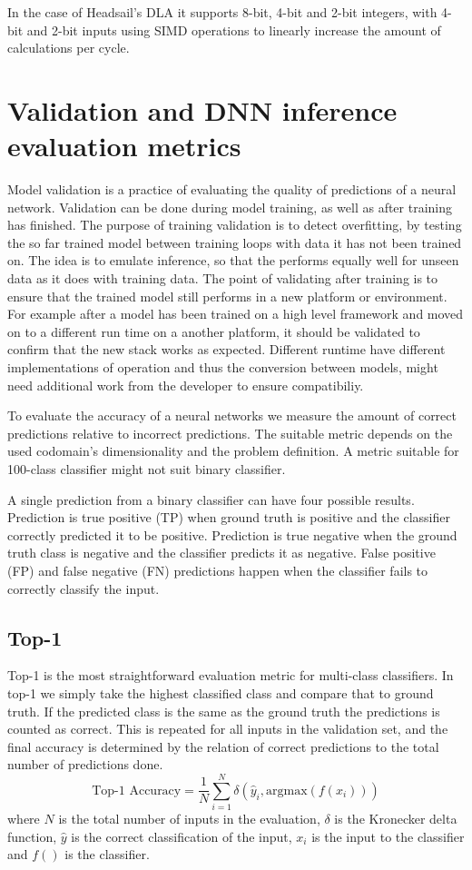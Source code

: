 \documentclass[12pt,a4paper,english
]{tunithesis}
\begin{document}
In the case of Headsail's DLA it supports 8-bit, 4-bit and 2-bit integers, with 4-bit and 2-bit inputs using SIMD operations to linearly increase the amount of calculations per cycle.

\section{Validation and DNN inference evaluation metrics}
Model validation is a practice of evaluating the quality of predictions of a neural network. Validation can be done during model training, as well as after training has finished. The purpose of training validation is to detect overfitting, by testing the so far trained model between training loops with data it has not been trained on. The idea is to emulate inference, so that the performs equally well for unseen data as it does with training data. The point of validating after training is to ensure that the trained model still performs in a new platform or environment. For example after a model has been trained on a high level framework and moved on to a different run time on a another platform, it should be validated to confirm that the new stack works as expected. Different runtime have different implementations of operation and thus the conversion between models, might need additional work from the developer to ensure compatibiliy.

To evaluate the accuracy of a neural networks we measure the amount of correct predictions relative to incorrect predictions. The suitable metric depends on the used codomain's dimensionality and the problem definition. A metric suitable for 100-class classifier might not suit binary classifier.

A single prediction from a binary classifier can have four possible results. Prediction is true positive (TP) when ground truth is positive and the classifier correctly predicted it to be positive. Prediction is true negative when the ground truth class is negative and the classifier predicts it as negative. False positive (FP) and false negative (FN) predictions happen when the classifier fails to correctly classify the input.

\subsection{Top-1}
Top-1 is the most straightforward evaluation metric for multi-class classifiers. In top-1 we simply take the highest classified class and compare that to ground truth. If the predicted class is the same as the ground truth the predictions is counted as correct. This is repeated for all inputs in the validation set, and the final accuracy is determined by the relation of correct predictions to the total number of predictions done.
\begin{equation}
\text{Top-1 Accuracy} = \frac{1}{N} \sum_{i=1}^{N} \delta(\hat{y}_i, \text{argmax}(f(x_i)))
\end{equation}
where $N$ is the total number of inputs in the evaluation, $\delta$ is the Kronecker delta function, $\hat{y}$ is the correct classification of the input, $x_i$ is the input to the classifier and $f()$ is the classifier.
\end{document}
